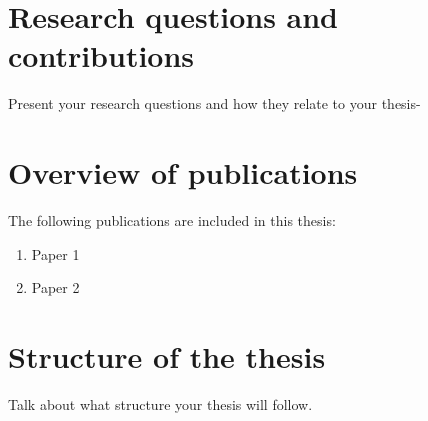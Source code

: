 \section{Research questions and contributions}

Present your research questions and how they relate to your thesis-


\section{Overview of publications}

The following publications are included in this thesis:
\begin{enumerate}
    \item Paper 1
    \item Paper 2
\end{enumerate}


\section{Structure of the thesis}

Talk about what structure your thesis will follow.